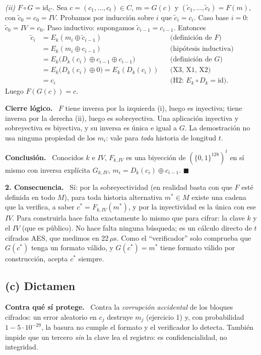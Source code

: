 \documentclass[11pt,letterpaper]{article}
\newcommand{\xor}{\oplus}
\newcommand{\B}{\{0,1\}^{128}}
\newcommand{\paso}[1]{\par\smallskip\noindent\textbf{#1.}\ }
\begin{document}
\emph{(ii) $F\circ G=\mathrm{id}_C$.} Sea $c=(c_1,\dots,c_t)\in C$, $m = G(c)$ y $(\tilde c_1,\dots,\tilde c_t) = F(m)$, con
$\tilde c_0 = c_0 = IV$. Probamos por inducción sobre $i$ que $\tilde c_i = c_i$.
Caso base $i=0$: $\tilde c_0 = IV = c_0$. Paso inductivo: supongamos $\tilde c_{i-1}=c_{i-1}$. Entonces
\begin{align*}
\tilde c_i &= E_k(m_i\xor \tilde c_{i-1}) && \text{(definición de } F)\\
&= E_k(m_i\xor c_{i-1}) && \text{(hipótesis inductiva)}\\
&= E_k\bigl(D_k(c_i)\xor c_{i-1}\xor c_{i-1}\bigr) && \text{(definición de } G)\\
&= E_k\bigl(D_k(c_i)\xor 0\bigr) = E_k(D_k(c_i)) && \text{(X3, X1, X2)}\\
&= c_i && \text{(H2: } E_k\circ D_k=\mathrm{id}).
\end{align*}
Luego $F(G(c)) = c$.

\paso{Cierre lógico}
$F$ tiene inversa por la izquierda (i), luego es inyectiva; tiene inversa por la derecha (ii), luego es
sobreyectiva. Una aplicación inyectiva y sobreyectiva es biyectiva, y su inversa es única e igual a $G$.
La demostración no usa ninguna propiedad de los $m_i$: vale para \emph{toda} historia de longitud $t$.

\paso{Conclusión}
Conocidos $k$ e $IV$, $F_{k,IV}$ es una biyección de $(\B)^t$ en sí mismo con inversa explícita
$G_{k,IV}$, $m_i = D_k(c_i)\xor c_{i-1}$. \hfill$\blacksquare$

\paso{2. Consecuencia}
Sí: por la sobreyectividad (en realidad basta con que $F$ esté definida en todo $M$), para toda historia
alternativa $m^*\in M$ existe una cadena que la verifica, a saber $c^* = F_{k,IV}(m^*)$, y por la inyectividad es la única
con ese $IV$. Para construirla hace falta exactamente lo mismo que para cifrar: la clave $k$ y el $IV$
(que es público). No hace falta ninguna búsqueda; es un cálculo directo de $t$ cifrados AES, que
medimos en 22\,$\mu$s. Como el ``verificador'' solo comprueba que $G(c^*)$ tenga un formato válido, y
$G(c^*) = m^*$ tiene formato válido por construcción, acepta $c^*$ siempre.

\subsection*{(c) Dictamen}

\paso{Contra qué sí protege}
Contra la \emph{corrupción accidental} de los bloques cifrados: un error aleatorio en $c_j$ destruye
$m_j$ (ejercicio 1) y, con probabilidad $1-5\cdot10^{-29}$, la basura no cumple el formato y el
verificador lo detecta. También impide que un tercero \emph{sin} la clave lea el registro: es
confidencialidad, no integridad.
\end{document}
